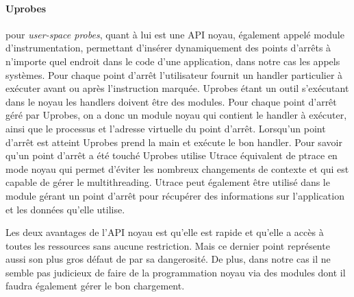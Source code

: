 \paragraph{Uprobes}\cite{INTERCEPTION:AS, INTERCEPTION:MARION}
pour \textit{user-space probes}, quant à lui est une API noyau, également appelé
module d'instrumentation, permettant d'insérer dynamiquement des points d'arrêts
à n'importe quel endroit dans le code d'une application, dans notre cas les
appels systèmes. Pour chaque point d'arrêt l’utilisateur fournit un handler
particulier à exécuter avant ou après l’instruction marquée. Uprobes étant un
outil s'exécutant dans le noyau les handlers doivent être des modules. Pour
chaque point d'arrêt géré par Uprobes, on a donc un module noyau qui contient le
handler à exécuter, ainsi que le processus et l'adresse virtuelle du point
d'arrêt. Lorsqu'un point d'arrêt est atteint Uprobes prend la main et exécute le
bon handler. Pour savoir qu'un point d'arrêt a été touché Uprobes utilise Utrace
équivalent de ptrace en mode noyau qui permet d'éviter les nombreux changements
de contexte et qui est capable de gérer le multithreading. Utrace peut également
être utilisé dans le module gérant un point d'arrêt pour récupérer des
informations sur l'application et les données qu'elle utilise.

Les deux avantages de l'API noyau est qu'elle est rapide et qu'elle a accès à
toutes les ressources sans aucune restriction. Mais ce dernier point représente
aussi son plus gros défaut de par sa dangerosité. De plus, dans notre cas il ne
semble pas judicieux de faire de la programmation noyau via des modules dont il
faudra également gérer le bon chargement.

